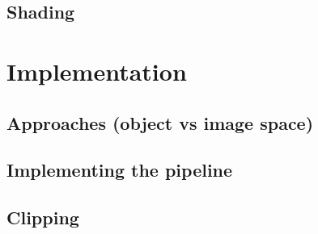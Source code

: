 \documentclass[11pt,a4paper]{article}
\begin{document}
	\subsection{Shading}

\section{Implementation}
	\subsection{Approaches (object vs image space)}
	\subsection{Implementing the pipeline}
	\subsection{Clipping}
\end{document}

